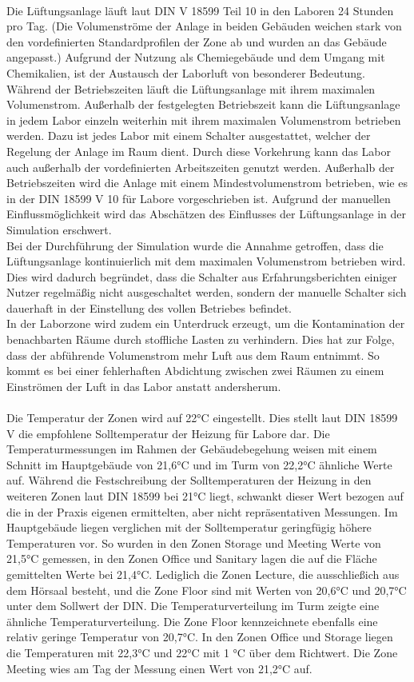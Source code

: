 \\
Die Lüftungsanlage läuft laut DIN V 18599 Teil 10 in den Laboren 24 Stunden pro Tag. (Die Volumenströme der Anlage in beiden Gebäuden weichen stark von den vordefinierten Standardprofilen der Zone ab und wurden an das Gebäude angepasst.) Aufgrund der Nutzung als Chemiegebäude und dem Umgang mit Chemikalien, ist der Austausch der Laborluft von besonderer Bedeutung. Während der Betriebszeiten läuft die Lüftungsanlage mit ihrem maximalen Volumenstrom. Außerhalb der festgelegten Betriebszeit kann die Lüftungsanlage in jedem Labor einzeln weiterhin mit ihrem maximalen Volumenstrom betrieben werden. Dazu ist jedes Labor mit einem Schalter ausgestattet, welcher der Regelung der Anlage im Raum dient. Durch diese Vorkehrung kann das Labor auch außerhalb der vordefinierten Arbeitszeiten genutzt werden. Außerhalb der Betriebszeiten wird die Anlage mit einem Mindestvolumenstrom betrieben, wie es in der DIN 18599 V 10 für Labore vorgeschrieben ist. Aufgrund der manuellen Einflussmöglichkeit wird das Abschätzen des Einflusses der Lüftungsanlage in der Simulation erschwert.\\
Bei der Durchführung der Simulation wurde die Annahme getroffen, dass die Lüftungsanlage kontinuierlich mit dem maximalen Volumenstrom betrieben wird. Dies wird dadurch begründet, dass die Schalter aus Erfahrungsberichten einiger Nutzer regelmäßig nicht ausgeschaltet werden, sondern der manuelle Schalter sich dauerhaft in der Einstellung des vollen Betriebes befindet. \\
In der Laborzone wird zudem ein Unterdruck erzeugt, um die Kontamination der benachbarten Räume durch stoffliche Lasten zu verhindern. Dies hat zur Folge, dass der abführende Volumenstrom mehr Luft aus dem Raum entnimmt. So kommt es bei einer fehlerhaften Abdichtung zwischen zwei Räumen zu einem Einströmen der Luft in das Labor anstatt andersherum.\\
\\
Die Temperatur der Zonen wird auf 22°C eingestellt. Dies stellt laut DIN 18599 V die empfohlene Solltemperatur der Heizung für Labore dar. Die Temperaturmessungen im Rahmen der Gebäudebegehung weisen mit einem Schnitt im Hauptgebäude von 21,6°C und im Turm von 22,2°C ähnliche Werte auf. Während die Festschreibung der Solltemperaturen der Heizung in den weiteren Zonen laut DIN 18599 bei 21°C liegt, schwankt dieser Wert bezogen auf die in der Praxis eigenen ermittelten, aber nicht repräsentativen Messungen. 
Im Hauptgebäude liegen verglichen mit der Solltemperatur geringfügig höhere Temperaturen vor. So wurden in den Zonen Storage und Meeting Werte von 21,5°C gemessen, in den Zonen Office und Sanitary lagen die auf die Fläche gemittelten Werte bei 21,4°C. Lediglich die Zonen Lecture, die ausschließich aus dem Hörsaal besteht, und die Zone Floor sind mit Werten von 20,6°C und 20,7°C unter dem Sollwert der DIN.
Die Temperaturverteilung im Turm zeigte eine ähnliche Temperaturverteilung. Die Zone Floor kennzeichnete ebenfalls eine relativ geringe Temperatur von 20,7°C. In den Zonen Office und Storage liegen die Temperaturen mit 22,3°C und 22°C mit 1 °C über dem Richtwert. Die Zone Meeting wies am Tag der Messung einen Wert von 21,2°C auf. 

